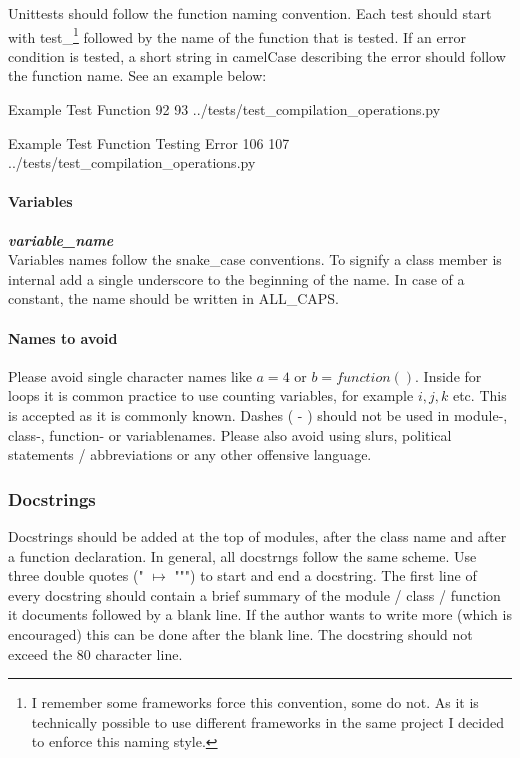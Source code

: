 Unittests should follow the function naming convention. Each test should start
with {\glqq test\_\grqq}\footnote{I remember some frameworks force this
convention, some do not. As it is technically possible to use different
frameworks in the same project I decided to enforce this naming style.}
followed by the name of the function that is tested. If an error condition is
tested, a short string in camelCase describing the error should follow the
function name. See an example below:

\codeexample
{Example Test Function}
{92}
{93}
{../tests/test_compilation_operations.py}

\codeexample
{Example Test Function Testing Error}
{106}
{107}
{../tests/test_compilation_operations.py}

\paragraph{Variables} \textbf{\textit{variable\_name}} \\
Variables names follow the snake\_case conventions. To signify a class member
is internal add a single underscore to the beginning of the name. In case of
a constant, the name should be written in ALL\_CAPS.

\paragraph{Names to avoid} 
Please avoid single character names like $a = 4$ or $b = function()$. Inside
for loops it is common practice to use counting variables, for example $i, j,
k$ etc. This is accepted as it is commonly known. Dashes ( - ) should not be
used in module-, class-, function- or variablenames. Please also avoid using
slurs, political statements / abbreviations or any other offensive language.

\subsubsection{Docstrings}\label{ssub:docstrings}
Docstrings should be added at the top of modules, after the class name and
after a function declaration. In general, all docstrngs follow the same scheme.
Use three double quotes (" $\mapsto$ """) to start and end a docstring.  The
first line of every docstring should contain a brief summary of the module /
class / function it documents followed by a blank line. If the author wants to
write more (which is encouraged) this can be done after the blank line.  The
docstring should not exceed the 80 character line.

